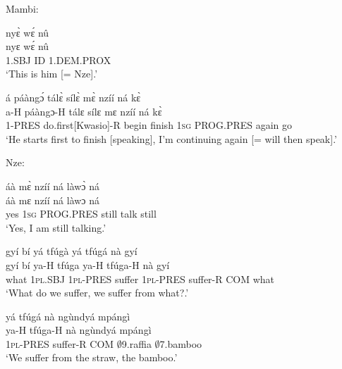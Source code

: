 \noindent Mambi:

\begin{exe} 
\exC\label{09}
  \glll     nyɛ̀ wɛ́ nû \\
           nyɛ wɛ́ nû \\
              1.SBJ ID 1.DEM.PROX \\
    \trans `This is him [= Nze].'
\end{exe}

\begin{exe} 
\exC\label{10} 
  \glll     á páàngɔ́ tálɛ̀ sílɛ̀ mɛ̀ nzíí ná kɛ̀ \\
            a-H páàngɔ-H tálɛ sílɛ mɛ nzíí ná kɛ̀\\
              1-PRES do.first[Kwasio]-R begin finish 1\textsc{sg} PROG.PRES again go \\ 
    \trans `He starts first to finish [speaking], I'm continuing again [= will then speak].'
\end{exe}

\noindent Nze:

\begin{exe} 
\exC\label{11}
  \glll     áà mɛ̀ nzíí ná làwɔ̀ ná \\
            áà mɛ nzíí ná làwɔ ná \\
              yes 1\textsc{sg} PROG.PRES still talk still \\
    \trans `Yes, I am still talking.'
\end{exe}

\begin{exe} 
\exC\label{12}
  \glll     gyí bí yá tfúgà yá tfúgá nà gyí \\
             gyí bí ya-H tfúga ya-H tfúga-H nà gyí\\
              what 1\textsc{pl}.SBJ 1\textsc{pl}-PRES suffer 1\textsc{pl}-PRES suffer-R COM what \\
    \trans `What do we suffer, we suffer from what?.'
\end{exe}

\begin{exe} 
\exC\label{13}
  \glll     yá tfúgá nà ngùndyá mpángì \\
            ya-H tfúga-H nà ngùndyá mpángì \\
              1\textsc{pl}-PRES suffer-R COM $\emptyset$9.raffia $\emptyset$7.bamboo \\
    \trans `We suffer from the straw, the bamboo.'
\end{exe}

